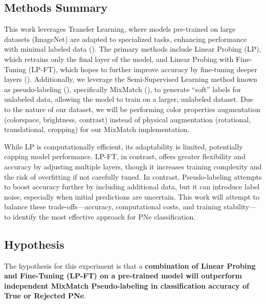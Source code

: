 \documentclass{article}
\begin{document}
\subsection{Methods Summary}

This work leverages Transfer Learning, where models pre-trained on large datasets (ImageNet) are adapted to specialized tasks, enhancing performance with minimal labeled data (\cite{pan2010survey}). The primary methods include Linear Probing (LP), which retrains only the final layer of the model, and  Linear Probing with Fine-Tuning (LP-FT),  which hopes to further improve accuracy by fine-tuning deeper layers (\cite{kumar2022lpft}). Additionally, we leverage the Semi-Supervised Learning method known as pseudo-labeling (\cite{lee2013pseudo}), specifically MixMatch (\cite{berthelot2019mixmatch}), to generate ``soft'' labels for unlabeled data, allowing the model to train on a larger, unlabeled dataset. Due to the nature of our dataset, we will be performing color properties augmentation (colorspace, brightness, contrast) instead of physical augmentation (rotational, translational, cropping) for our MixMatch implementation.

While LP is computationally efficient, its adaptability is limited, potentially capping model performance. LP-FT, in contrast, offers greater flexibility and accuracy by adjusting multiple layers, though it increases training complexity and the risk of overfitting if not carefully tuned. In contrast, Pseudo-labeling attempts to boost accuracy further by including additional data, but it can introduce label noise, especially when initial predictions are uncertain. This work will attempt to balance these trade-offs---accuracy, computational costs, and training stability---to identify the most effective approach for PNe classification.

\subsection{Hypothesis}

The hypothesis for this experiment is that a \textbf{combination of Linear Probing and Fine-Tuning (LP-FT) on a pre-trained model will outperform independent MixMatch Pseudo-labeling in classification accuracy of True or Rejected PNe}. 
\end{document}
